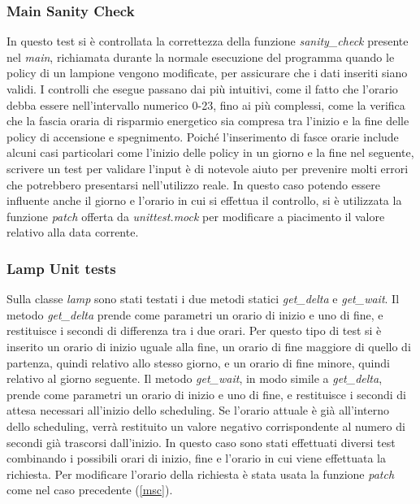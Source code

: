\subsubsection{Main Sanity Check \label{msc}}
In questo test si è controllata la correttezza della funzione \textit{sanity\_check} presente nel \textit{main}, richiamata durante la normale esecuzione del programma quando le policy di un lampione vengono modificate, per assicurare che i dati inseriti siano validi.
I controlli che esegue passano dai più intuitivi, come il fatto che l'orario debba essere nell'intervallo numerico 0-23, fino ai più complessi, come la verifica che la fascia oraria di risparmio energetico sia compresa tra l'inizio e la fine delle policy di accensione e spegnimento.
Poiché l'inserimento di fasce orarie include alcuni casi particolari come l'inizio delle policy in un giorno e la fine nel seguente, scrivere un test per validare l'input è di notevole aiuto per prevenire molti errori che potrebbero presentarsi nell'utilizzo reale.
In questo caso potendo essere influente anche il giorno e l'orario in cui si effettua il controllo, si è utilizzata la funzione \textit{patch} offerta da \textit{unittest.mock} per modificare a piacimento il valore relativo alla data corrente.

\subsubsection{Lamp Unit tests}
Sulla classe \textit{lamp} sono stati testati i due metodi statici \textit{get\_delta} e \textit{get\_wait}.
Il metodo \textit{get\_delta} prende come parametri un orario di inizio e uno di fine, e restituisce i secondi di differenza tra i due orari.
Per questo tipo di test si è inserito un orario di inizio uguale alla fine, un orario di fine maggiore di quello di partenza, quindi relativo allo stesso giorno, e un orario di fine minore, quindi relativo al giorno seguente.
Il metodo \textit{get\_wait}, in modo simile a \textit{get\_delta}, prende come parametri un orario di inizio e uno di fine, e restituisce i secondi di attesa necessari all'inizio dello scheduling.
Se l'orario attuale è già all'interno dello scheduling, verrà restituito un valore negativo corrispondente al numero di secondi già trascorsi dall'inizio.
In questo caso sono stati effettuati diversi test combinando i possibili orari di inizio, fine e l'orario in cui viene effettuata la richiesta.
Per modificare l'orario della richiesta è stata usata la funzione \textit{patch} come nel caso precedente (\ref{msc}).

